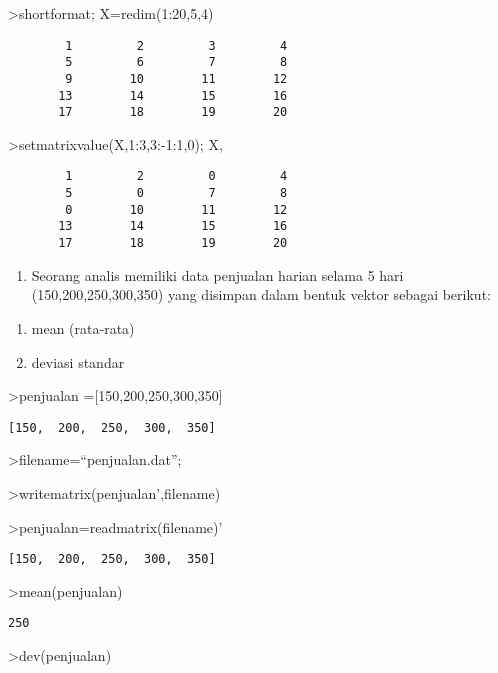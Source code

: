 \documentclass[
]{book}
\providecommand{\tightlist}{%
  \setlength{\itemsep}{0pt}\setlength{\parskip}{0pt}}
\begin{document}
\textgreater shortformat; X=redim(1:20,5,4)

\begin{verbatim}
        1         2         3         4 
        5         6         7         8 
        9        10        11        12 
       13        14        15        16 
       17        18        19        20 
\end{verbatim}

\textgreater setmatrixvalue(X,1:3,3:-1:1,0); X,

\begin{verbatim}
        1         2         0         4 
        5         0         7         8 
        0        10        11        12 
       13        14        15        16 
       17        18        19        20 
\end{verbatim}

\begin{enumerate}
\def\labelenumi{\arabic{enumi}.}
\setcounter{enumi}{2}
\tightlist
\item
  Seorang analis memiliki data penjualan harian selama 5 hari (150,200,250,300,350) yang disimpan dalam bentuk vektor sebagai berikut:
\end{enumerate}

\begin{enumerate}
\def\labelenumi{\alph{enumi}.}
\item
  mean (rata-rata)
\item
  deviasi standar
\end{enumerate}

\textgreater penjualan ={[}150,200,250,300,350{]}

\begin{verbatim}
[150,  200,  250,  300,  350]
\end{verbatim}

\textgreater filename=``penjualan.dat'';

\textgreater writematrix(penjualan',filename)

\textgreater penjualan=readmatrix(filename)'

\begin{verbatim}
[150,  200,  250,  300,  350]
\end{verbatim}

\textgreater mean(penjualan)

\begin{verbatim}
250
\end{verbatim}

\textgreater dev(penjualan)
\end{document}
